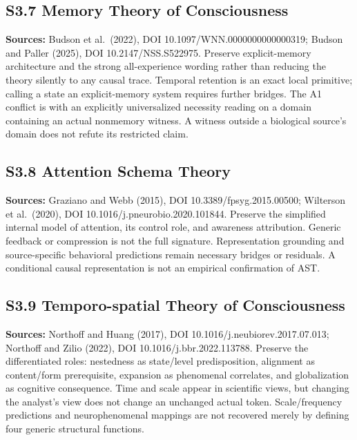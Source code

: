 \documentclass[
  11pt,
  a4paper,
]{article}
\begin{document}
\hypertarget{s3.7-memory-theory-of-consciousness}{%
\subsection{S3.7 Memory Theory of
Consciousness}\label{s3.7-memory-theory-of-consciousness}}

\textbf{Sources:} Budson et al.~(2022), DOI
10.1097/WNN.0000000000000319; Budson and Paller (2025), DOI
10.2147/NSS.S522975. Preserve explicit-memory architecture and the
strong all-experience wording rather than reducing the theory silently
to any causal trace. Temporal retention is an exact local primitive;
calling a state an explicit-memory system requires further bridges. The
A1 conflict is with an explicitly universalized necessity reading on a
domain containing an actual nonmemory witness. A witness outside a
biological source's domain does not refute its restricted claim.

\hypertarget{s3.8-attention-schema-theory}{%
\subsection{S3.8 Attention Schema
Theory}\label{s3.8-attention-schema-theory}}

\textbf{Sources:} Graziano and Webb (2015), DOI
10.3389/fpsyg.2015.00500; Wilterson et al.~(2020), DOI
10.1016/j.pneurobio.2020.101844. Preserve the simplified internal model
of attention, its control role, and awareness attribution. Generic
feedback or compression is not the full signature. Representation
grounding and source-specific behavioral predictions remain necessary
bridges or residuals. A conditional causal representation is not an
empirical confirmation of AST.

\hypertarget{s3.9-temporo-spatial-theory-of-consciousness}{%
\subsection{S3.9 Temporo-spatial Theory of
Consciousness}\label{s3.9-temporo-spatial-theory-of-consciousness}}

\textbf{Sources:} Northoff and Huang (2017), DOI
10.1016/j.neubiorev.2017.07.013; Northoff and Zilio (2022), DOI
10.1016/j.bbr.2022.113788. Preserve the differentiated roles: nestedness
as state/level predisposition, alignment as content/form prerequisite,
expansion as phenomenal correlates, and globalization as cognitive
consequence. Time and scale appear in scientific views, but changing the
analyst's view does not change an unchanged actual token.
Scale/frequency predictions and neurophenomenal mappings are not
recovered merely by defining four generic structural functions.
\end{document}
